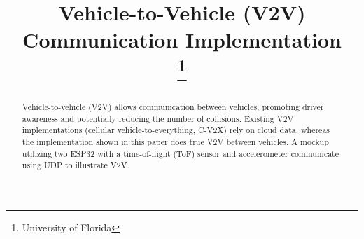 \documentclass[conference]{IEEEtran}
\begin{document}
\title{Vehicle-to-Vehicle (V2V) Communication Implementation\\
\thanks{University of Florida}
}

\author{
    \and
    \and
    \and
}

\maketitle

\begin{abstract}
Vehicle-to-vehicle (V2V) allows communication between vehicles, promoting driver
awareness and potentially reducing the number of collisions. Existing V2V
implementations (cellular vehicle-to-everything, C-V2X) rely on cloud data, whereas the
implementation shown in this paper does true V2V between vehicles. A mockup
utilizing two ESP32 with a time-of-flight (ToF) sensor and accelerometer
communicate using UDP to illustrate V2V.
\end{abstract}
\end{document}
